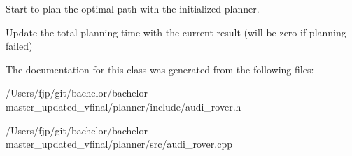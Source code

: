 Start to plan the optimal path with the initialized planner.

Update the total planning time with the current result (will be zero if planning failed) 

The documentation for this class was generated from the following files\+:\begin{DoxyCompactItemize}
\item 
/\+Users/fjp/git/bachelor/bachelor-\/master\+\_\+updated\+\_\+vfinal/planner/include/audi\+\_\+rover.\+h\item 
/\+Users/fjp/git/bachelor/bachelor-\/master\+\_\+updated\+\_\+vfinal/planner/src/audi\+\_\+rover.\+cpp\end{DoxyCompactItemize}
